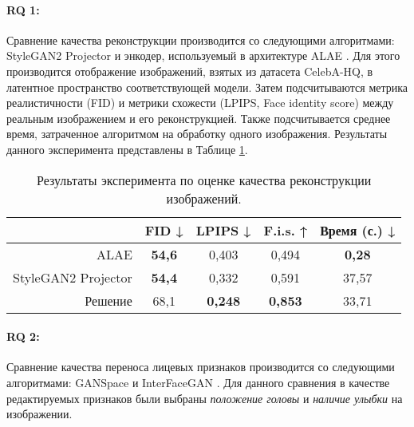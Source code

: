 \paragraph{RQ 1:}
Сравнение качества реконструкции производится со следующими алгоритмами: StyleGAN2 Projector \cite{karras2020stylegan2} и энкодер, используемый в архитектуре ALAE \cite{ALAE}.
Для этого производится отображение изображений, взятых из датасета CelebA-HQ, в латентное пространство соответствующей модели.
Затем подсчитываются метрика реалистичности (FID) и метрики схожести (LPIPS, Face identity score) между реальным изображением и его реконструкцией.
Также подсчитывается среднее время, затраченное алгоритмом на обработку одного изображения.
Результаты данного эксперимента представлены в Таблице \ref{tab:exp1}.

\begin{table}
\begin{center}
  \caption{Результаты эксперимента по оценке качества реконструкции изображений.}
  \label{tab:exp1}
  \begin{tabular}{ |r|c|c|c|c| } 
    \hline
      & FID ↓ & LPIPS ↓ & F.i.s. ↑ & Время (с.) ↓ \\ 
    \hline\hline
    ALAE    & \textbf{54,6} & 0,403 & 0,494 & \textbf{0,28}  \\ 
    StyleGAN2 Projector 
            & \textbf{54,4} & 0,332 & 0,591 & 37,57  \\ 
    Решение & 68,1 & \textbf{0,248} & \textbf{0,853} & 33,71 \\ 
    \hline
  \end{tabular}
\end{center}
\end{table}

\paragraph{RQ 2:}
Сравнение качества переноса лицевых признаков производится со следующими алгоритмами: GANSpace \cite{hrknen2020ganspace} и InterFaceGAN \cite{shen2020interfacegan}.
Для данного сравнения в качестве редактируемых признаков были выбраны \emph{положение головы} и \emph{наличие улыбки} на изображении.

